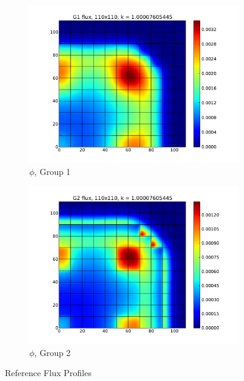\documentclass[11pt]{article}
\begin{document}
\begin{figure}[H]
\centering
  \begin{subfigure}[b]{0.45 \textwidth}
   \includegraphics[width=\textwidth]{g1_50_flux}
   \caption{$\phi$, Group 1}
   \label{g1}
  \end{subfigure}
  \begin{subfigure}[b]{0.45 \textwidth}
   \includegraphics[width=\textwidth]{g2_50_flux}
   \caption{$\phi$, Group 2}
   \label{g2}
  \end{subfigure}
  \caption{Reference Flux Profiles}
  \label{benchflux}
\end{figure}
\end{document}
